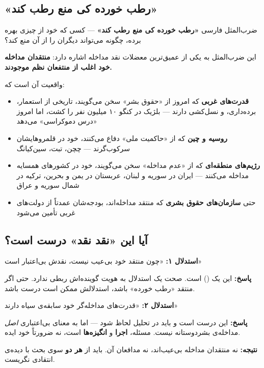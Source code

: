 \subsection{«رطب خورده کی منع رطب کند»}

\begin{histQuote}{ضرب‌المثل فارسی}
\textbf{«رطب خورده کی منع رطب کند»} —
کسی که خود از چیزی بهره برده، چگونه می‌تواند دیگران را از آن منع کند؟

این ضرب‌المثل به یکی از عمیق‌ترین معضلات نقد مداخله اشاره دارد:
\textbf{منتقدان مداخله خود اغلب از منتفعان نظم موجودند.}
\end{histQuote}

واقعیت آن است که:

\begin{itemize}
\item \textbf{قدرت‌های غربی} که امروز از «حقوق بشر» سخن می‌گویند، تاریخی
از استعمار، برده‌داری، و نسل‌کشی دارند — بلژیک در کنگو ۱۰ میلیون نفر را
کشت، اما امروز «درس دموکراسی» می‌دهد
\item \textbf{روسیه و چین} که از «حاکمیت ملی» دفاع می‌کنند، خود در
قلمروهایشان سرکوب‌گرند — چچن، تبت، سین‌کیانگ
\item \textbf{رژیم‌های منطقه‌ای} که از «عدم مداخله» سخن می‌گویند، خود در
کشورهای همسایه مداخله می‌کنند — ایران در سوریه و لبنان، عربستان در یمن و
بحرین، ترکیه در شمال سوریه و عراق
\item حتی \textbf{سازمان‌های حقوق بشری} که منتقد مداخله‌اند، بودجه‌شان
عمدتاً از دولت‌های غربی تأمین می‌شود
\end{itemize}


\subsection{آیا این «نقد نقد» درست است؟}

\begin{tcolorbox}[wavebox, title={تحلیل منطقی}]
\textbf{استدلال ۱:} «چون منتقد خود بی‌عیب نیست، نقدش بی‌اعتبار است»

\textbf{پاسخ:} این یک  ()
است. صحت یک استدلال به هویت گوینده‌اش ربطی ندارد. حتی اگر منتقد
«رطب خورده» باشد، استدلالش ممکن است درست باشد.

\tcblower

\textbf{استدلال ۲:} «قدرت‌های مداخله‌گر خود سابقه‌ی سیاه دارند»

\textbf{پاسخ:} این درست است و باید در تحلیل لحاظ شود — اما به معنای
بی‌اعتباری \textit{اصل} مداخله‌ی بشردوستانه نیست. مسئله، \textbf{اجرا}
و \textbf{انگیزه‌ها} است، نه ضرورتاً خود ایده.

\tcblower

\textbf{نتیجه:} نه منتقدان مداخله بی‌عیب‌اند، نه مدافعان آن. باید از
\textbf{هر دو} سوی بحث با دیده‌ی انتقادی نگریست.
\end{tcolorbox}



